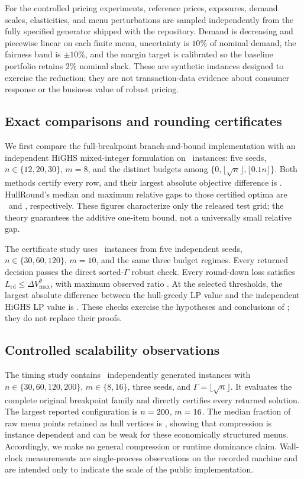 \documentclass[11pt, a4paper]{article}
\theoremstyle{plain}
\theoremstyle{definition}
\theoremstyle{remark}
\begin{document}
For the controlled pricing experiments, reference prices, exposures, demand
scales, elasticities, and menu perturbations are sampled independently from the
fully specified generator shipped with the repository.  Demand is decreasing
and piecewise linear on each finite menu, uncertainty is $10\%$ of nominal
demand, the fairness band is $\pm10\%$, and the margin target is calibrated so
the baseline portfolio retains $2\%$ nominal slack.  These are synthetic
instances designed to exercise the reduction; they are not transaction-data
evidence about consumer response or the business value of robust pricing.

\subsection{Exact comparisons and rounding certificates}

We first compare the full-breakpoint branch-and-bound implementation with an
independent HiGHS mixed-integer formulation on \ExactComparisonRows\ instances:
five seeds, $n\in\{12,20,30\}$, $m=8$, and the distinct budgets among
$\{0,\lfloor\sqrt n\rfloor,\lfloor0.1n\rfloor\}$.  Both methods certify every
row, and their largest absolute objective difference is
\MaxSolverDifference.  HullRound's median and maximum relative gaps to those
certified optima are \MedianHullRoundGapPct\ and \MaxHullRoundGapPct,
respectively.  These figures characterize only the released test grid; the
theory guarantees the additive one-item bound, not a universally small
relative gap.

The certificate study uses \CertificateRows\ instances from five independent
seeds, $n\in\{30,60,120\}$, $m=10$, and the same three budget regimes.  Every
returned decision passes the direct sorted-$\Gamma$ robust check.  Every
round-down loss satisfies
$L_{\mathrm{rd}}\le\Delta V_{\max}^{\theta}$, with maximum observed ratio
\MaxLossBoundRatio.  At the selected thresholds, the largest absolute
difference between the hull-greedy LP value and the independent HiGHS LP value
is \MaxLPDifference.  These checks exercise the hypotheses and conclusions of
; they do not replace their
proofs.

\subsection{Controlled scalability observations}

The timing study contains \ScaleRows\ independently generated instances with
$n\in\{30,60,120,200\}$, $m\in\{8,16\}$, three seeds, and
$\Gamma=\lfloor\sqrt n\rfloor$.  It evaluates the complete original
breakpoint family and directly certifies every returned solution.  The largest
reported configuration is $n=200$, $m=16$.  The median fraction of
raw menu points retained as hull vertices is \MedianHullFractionPct, showing
that compression is instance dependent and can be weak for these economically
structured menus.  Accordingly, we make no general compression or runtime
dominance claim.  Wall-clock measurements are single-process observations on
the recorded machine and are intended only to indicate the scale of the public
implementation.
\end{document}
